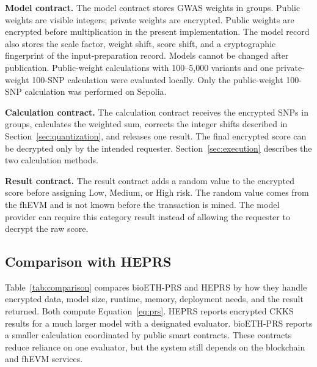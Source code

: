 \documentclass[10pt]{article}
\begin{document}
\textbf{Model contract.}
The model contract stores GWAS weights in groups.  Public weights are visible
integers; private weights are encrypted.  Public weights are encrypted before
multiplication in the present implementation.  The model record also stores the scale
factor, weight shift, score shift, and a cryptographic fingerprint of the input-preparation
record.  Models cannot be changed after publication.  Public-weight calculations with
100--5,000 variants and one private-weight 100-SNP calculation were evaluated locally.
Only the public-weight 100-SNP calculation was performed on Sepolia.

\textbf{Calculation contract.}
The calculation contract receives the encrypted SNPs in groups, calculates the weighted
sum, corrects the integer shifts described in Section~\ref{sec:quantization}, and
releases one result.  The final encrypted score can be decrypted only by the intended
requester.  Section~\ref{sec:execution} describes the two calculation methods.

\textbf{Result contract.}
The result contract adds a random value to the encrypted score before assigning Low,
Medium, or High risk.
The random value comes from the fhEVM and is not known before the transaction is mined.
The model provider can require this category result instead of allowing the requester to
decrypt the raw score.

\subsection{Comparison with HEPRS}

Table~\ref{tab:comparison} compares bioETH-PRS and HEPRS
\citep{knight2026heprs} by how they handle encrypted data, model size, runtime, memory,
deployment needs, and the result returned.  Both compute Equation~\ref{eq:prs}.  HEPRS reports encrypted CKKS
results for a much larger model with a designated evaluator.  bioETH-PRS reports a
smaller calculation coordinated by public smart contracts.  These contracts reduce
reliance on one evaluator, but the system still depends on the blockchain and fhEVM
services.
\end{document}
